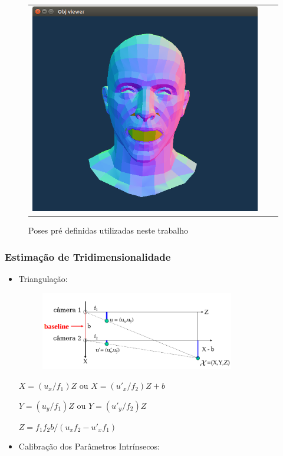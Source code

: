 \documentclass[brazil]{beamer}
\begin{document}
\begin{frame}
\begin{itemize}
\begin{figure}
\begin{tabular}{ccc}
\includegraphics[width=0.3\linewidth]{./img/open-mouth.png} \\
	\end{tabular}
	\caption{Poses pré definidas utilizadas neste trabalho}
     \end{figure}         
  \end{itemize} 
\end{frame}
 

\begin{frame}
\frametitle{Estimação de Tridimensionalidade}
  \begin{itemize}
      \item Triangulação:
      
      \begin{figure}
        \centering
        \includegraphics[width = 0.8\textwidth, keepaspectratio]{./img/TG_triangulation_pdf_washington_pt2.png}
      \end{figure}
      
      $X = (u_x/f_1)  Z$ ou $ X = (u'_x/f_2)  Z + b $
      
      $Y = (u_y/f_1) Z$ ou $ Y = (u'_y/f_2) Z$
      
      $Z = f_1  f_2  b / (u_x  f_2 - u'_x  f_1)$
      
      \item Calibração dos Parâmetros Intrínsecos:
  \end{itemize} 
\end{frame}
\end{document}
